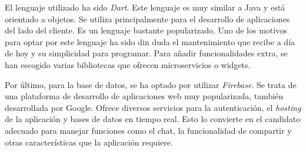 \documentclass[a4paper, 12pt]{article}
\begin{document}
El lenguaje utilizado ha sido \textit{Dart}. Este lenguaje es muy similar a Java y está orientado a objetos. Se utiliza principalmente para el desarrollo de aplicaciones del lado del cliente. Es un lenguaje bastante popularizado. Uno de los motivos para optar por este lenguaje ha sido din duda el mantenimiento que recibe a día de hoy y su simplicidad para programar. Para añadir funcionalidades extra, se han escogido varias bibliotecas que ofrecen microservicios o widgets.

Por último, para la base de datos, se ha optado por utilizar \textit{Firebase}. Se trata de una plataforma de desarrollo de aplicaciones web muy popularizada, también desarrollada por Google. Ofrece diversos servicios para la autenticación, el \textit{hosting} de la aplicación y bases de datos en tiempo real. Esto lo convierte en el candidato adecuado para manejar funciones como el chat, la funcionalidad de compartir y otras características que la aplicación requiere.
\end{document}
